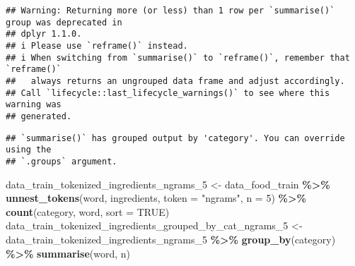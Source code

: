 \documentclass[
]{article}
\newenvironment{Shaded}{\begin{snugshade}}{\end{snugshade}}
\newcommand{\AttributeTok}[1]{\textcolor[rgb]{0.13,0.29,0.53}{#1}}
\newcommand{\ConstantTok}[1]{\textcolor[rgb]{0.56,0.35,0.01}{#1}}
\newcommand{\DecValTok}[1]{\textcolor[rgb]{0.00,0.00,0.81}{#1}}
\newcommand{\FunctionTok}[1]{\textcolor[rgb]{0.13,0.29,0.53}{\textbf{#1}}}
\newcommand{\NormalTok}[1]{#1}
\newcommand{\OtherTok}[1]{\textcolor[rgb]{0.56,0.35,0.01}{#1}}
\newcommand{\SpecialCharTok}[1]{\textcolor[rgb]{0.81,0.36,0.00}{\textbf{#1}}}
\newcommand{\StringTok}[1]{\textcolor[rgb]{0.31,0.60,0.02}{#1}}
\begin{document}
\begin{verbatim}
## Warning: Returning more (or less) than 1 row per `summarise()` group was deprecated in
## dplyr 1.1.0.
## i Please use `reframe()` instead.
## i When switching from `summarise()` to `reframe()`, remember that `reframe()`
##   always returns an ungrouped data frame and adjust accordingly.
## Call `lifecycle::last_lifecycle_warnings()` to see where this warning was
## generated.
\end{verbatim}

\begin{verbatim}
## `summarise()` has grouped output by 'category'. You can override using the
## `.groups` argument.
\end{verbatim}

\begin{Shaded}
\end{Shaded}

\begin{Shaded}
\begin{Highlighting}[]
\NormalTok{data\_train\_tokenized\_ingredients\_ngrams\_5 }\OtherTok{\textless{}{-}}\NormalTok{ data\_food\_train }\SpecialCharTok{\%\textgreater{}\%} \FunctionTok{unnest\_tokens}\NormalTok{(word, ingredients, }\AttributeTok{token =} \StringTok{"ngrams"}\NormalTok{, }\AttributeTok{n =} \DecValTok{5}\NormalTok{) }\SpecialCharTok{\%\textgreater{}\%} \FunctionTok{count}\NormalTok{(category, word, }\AttributeTok{sort =} \ConstantTok{TRUE}\NormalTok{)}
\NormalTok{data\_train\_tokenized\_ingredients\_grouped\_by\_cat\_ngrams\_5 }\OtherTok{\textless{}{-}}\NormalTok{ data\_train\_tokenized\_ingredients\_ngrams\_5 }\SpecialCharTok{\%\textgreater{}\%} \FunctionTok{group\_by}\NormalTok{(category) }\SpecialCharTok{\%\textgreater{}\%} \FunctionTok{summarise}\NormalTok{(word, n)}
\end{Highlighting}
\end{Shaded}
\end{document}

